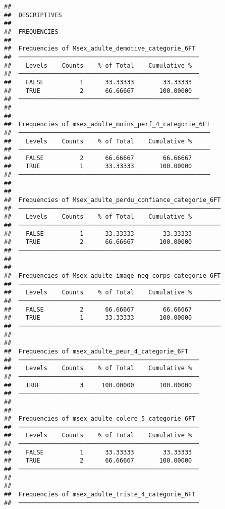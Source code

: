 \documentclass[
]{article}
\begin{document}
\begin{verbatim}
## 
##  DESCRIPTIVES
## 
##  FREQUENCIES
## 
##  Frequencies of Msex_adulte_demotive_categorie_6FT  
##  ────────────────────────────────────────────────── 
##    Levels    Counts    % of Total    Cumulative %   
##  ────────────────────────────────────────────────── 
##    FALSE          1      33.33333        33.33333   
##    TRUE           2      66.66667       100.00000   
##  ────────────────────────────────────────────────── 
## 
## 
##  Frequencies of msex_adulte_moins_perf_4_categorie_6FT 
##  ───────────────────────────────────────────────────── 
##    Levels    Counts    % of Total    Cumulative %   
##  ───────────────────────────────────────────────────── 
##    FALSE          2      66.66667        66.66667   
##    TRUE           1      33.33333       100.00000   
##  ───────────────────────────────────────────────────── 
## 
## 
##  Frequencies of Msex_adulte_perdu_confiance_categorie_6FT 
##  ──────────────────────────────────────────────────────── 
##    Levels    Counts    % of Total    Cumulative %   
##  ──────────────────────────────────────────────────────── 
##    FALSE          1      33.33333        33.33333   
##    TRUE           2      66.66667       100.00000   
##  ──────────────────────────────────────────────────────── 
## 
## 
##  Frequencies of Msex_adulte_image_neg_corps_categorie_6FT 
##  ──────────────────────────────────────────────────────── 
##    Levels    Counts    % of Total    Cumulative %   
##  ──────────────────────────────────────────────────────── 
##    FALSE          2      66.66667        66.66667   
##    TRUE           1      33.33333       100.00000   
##  ──────────────────────────────────────────────────────── 
## 
## 
##  Frequencies of msex_adulte_peur_4_categorie_6FT    
##  ────────────────────────────────────────────────── 
##    Levels    Counts    % of Total    Cumulative %   
##  ────────────────────────────────────────────────── 
##    TRUE           3     100.00000       100.00000   
##  ────────────────────────────────────────────────── 
## 
## 
##  Frequencies of msex_adulte_colere_5_categorie_6FT  
##  ────────────────────────────────────────────────── 
##    Levels    Counts    % of Total    Cumulative %   
##  ────────────────────────────────────────────────── 
##    FALSE          1      33.33333        33.33333   
##    TRUE           2      66.66667       100.00000   
##  ────────────────────────────────────────────────── 
## 
## 
##  Frequencies of msex_adulte_triste_4_categorie_6FT  
##  ────────────────────────────────────────────────── 

\end{verbatim}
\end{document}
